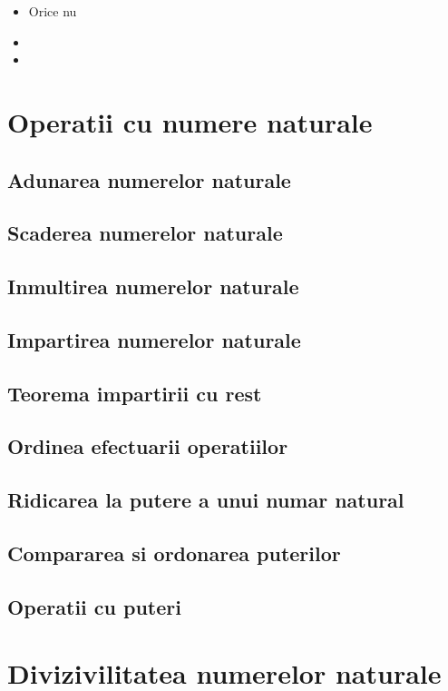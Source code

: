 \documentclass[a4paper,10pt]{article}
\begin{document}
	\begin{itemize}
		\item Orice nu
		\item
		\item 
	\end{itemize}
	


	

	\section{Operatii cu numere naturale}
	\subsection{Adunarea numerelor naturale}
	\subsection{Scaderea numerelor naturale}
	\subsection{Inmultirea numerelor naturale}
	\subsection{Impartirea numerelor naturale}
	\subsection{Teorema impartirii cu rest}
	\subsection{Ordinea efectuarii operatiilor}
	\subsection{Ridicarea la putere a unui numar natural}
	\subsection{Compararea si ordonarea puterilor}
	\subsection{Operatii cu puteri}
	\section{Divizivilitatea numerelor naturale}
\end{document}
